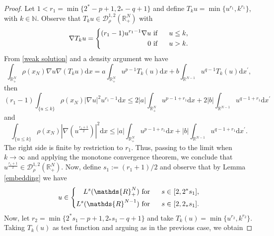 \documentclass[12pt,reqno]{amsart}
\begin{document}
\begin{proof} Let $1<r_1=\min\{2^\ast-p+1, 2_\ast-q+1\}$ and define $T_ku= \min\{u^{r_1}, k^{r_1}\}$, with $k \in \mathds{N}$. Observe that $T_ku \in \mathcal{D}^{1,2}_\rho(\mathds{R}^N_+)$ with 
\begin{equation*}
    \nabla T_ku=\left\{
		\begin{aligned}
			(r_1-1)u^{r_1-1}\nabla u\ &\mbox{if }&\ u\leq k,
			\vspace{0.2cm}\\
			0\ &\mbox{if }&\ u>k.
		\end{aligned}
		\right.
\end{equation*}
From \eqref{weak solution} and a density argument we have
\begin{equation*}
    \int_{\mathds{R}^N_+}\rho(x_N)\nabla u \nabla(T_ku)\mathrm{d}x= a\int_{\mathds{R}^N_+}u^{p-1} T_k(u)\mathrm{d}x+b\int_{\mathds{R}^{N-1}}u^{q-1}T_k(u)\mathrm{d}x^\prime,
\end{equation*}
then
\begin{equation*}
    (r_1-1)\int_{\{u\leq k\}}\rho(x_N)|\nabla u|^2u^{r_1-1}\mathrm{d}x\leq 2|a| \int_{\mathds{R}^N_+} u^{p-1+r_1}\mathrm{d}x+2|b|\int_{\mathds{R}^{N-1}}u^{q-1+r_1}\mathrm{d}x^\prime
\end{equation*}
and
\begin{equation*}
    \int_{\{u\leq k\}}\rho(x_N)|\nabla (u^{\frac{r_1+1}{2}})|^2\mathrm{d}x\leq |a| \int_{\mathds{R}^N_+} u^{p-1+r_1}\mathrm{d}x+|b|\int_{\mathds{R}^{N-1}}u^{q-1+r_1}\mathrm{d}x^\prime.
\end{equation*}
The right side is finite by restriction to $r_1$. Thus, passing to the limit when $k \longrightarrow \infty$ and applying the monotone convergence theorem, we conclude that $u^{\frac{r_1+1}{2}} \in \mathcal{D}^{1,2}_\rho(\mathds{R}^N_+) $. Now, define $s_1:= (r_1+1)/2$ and observe that by Lemma \ref{embedding} we have
\begin{equation}\label{u in Ls}
   u \in \left\{
		\begin{aligned}
			L^s(\mathds{R}^N_+) \ &\mbox{for }&\ s \in\ &[2, 2^\ast s_1],
			\vspace{0.2cm}\\
			L^s(\mathds{R}^{N-1}) \ &\mbox{for }&\ s \in\ & [2, 2_\ast s_1].
		\end{aligned}
		\right.
\end{equation}
Now, let $r_2 = \min\{2^\ast s_1 -p+1, 2_\ast s_1-q+1\}$ and take $T_k(u)=\min\{u^{r_2},k^{r_2}\}$. Taking $T_k(u)$ as test function and arguing as in the previous case, we obtain

\end{proof}
\end{document}
